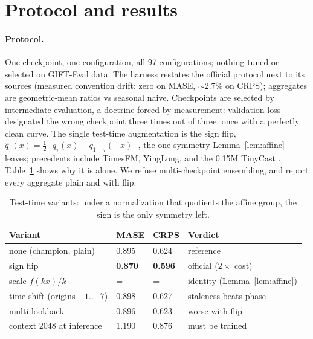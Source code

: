 \section{Protocol and results}
\label{sec:results}

\paragraph{Protocol.}
One checkpoint, one configuration, all 97 configurations; nothing tuned
or selected on GIFT-Eval data. The harness restates the official
protocol next to its sources (measured convention drift: zero on MASE,
$\sim$2.7\% on CRPS); aggregates are geometric-mean ratios vs seasonal
naive. Checkpoints are selected by intermediate evaluation, a doctrine
forced by measurement: validation loss designated the wrong checkpoint
three times out of three, once with a perfectly clean curve. The single
test-time augmentation is the sign flip,
$\hat{q}_\tau(x) = \tfrac{1}{2}[q_\tau(x) - q_{1-\tau}(-x)]$, the one
symmetry Lemma~\ref{lem:affine} leaves; precedents include TimesFM,
YingLong, and the 0.15M TinyCast
\citep{das2024timesfm,yinglong2025}. Table~\ref{tab:tta} shows why it
is alone. We refuse multi-checkpoint ensembling, and report every aggregate
plain and with flip.

\begin{table}[t]
\centering
\scriptsize
\begin{tabular}{llll}
\toprule
Variant & MASE & CRPS & Verdict \\
\midrule
none (champion, plain) & 0.895 & 0.624 & reference \\
sign flip & \textbf{0.870} & \textbf{0.596} & official ($2\times$ cost) \\
scale $f(kx)/k$ & = & = & identity (Lemma~\ref{lem:affine}) \\
time shift (origins $-1..{-7}$) & 0.898 & 0.627 & staleness beats phase \\
multi-lookback & 0.896 & 0.623 & worse with flip \\
context 2048 at inference & 1.190 & 0.876 & must be trained \\
\bottomrule
\end{tabular}
\caption{Test-time variants: under a normalization that quotients the
affine group, the sign is the only symmetry left.}
\label{tab:tta}
\end{table}


